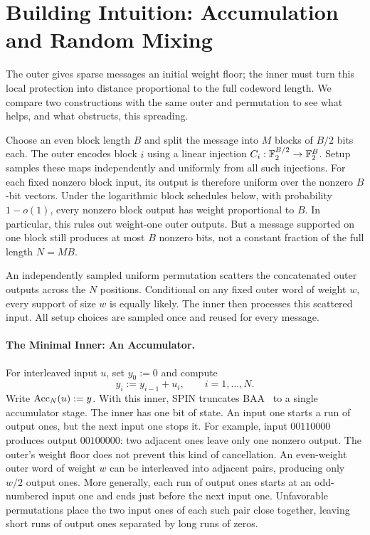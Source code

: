 \section{Building Intuition: Accumulation and Random Mixing}
\label{sec:spin-intuition}

The outer gives sparse messages an initial weight floor; the inner must
turn this local protection into distance proportional to the full codeword
length. We compare two constructions with the same outer and permutation
to see what helps, and what obstructs, this spreading.

Choose an even block length $B$ and split the message into $M$ blocks of
$B/2$ bits each. The outer encodes block $i$ using a linear injection
$C_i:\mathbb F_2^{B/2}\to\mathbb F_2^B$. Setup samples these maps independently and
uniformly from all such injections. For each fixed nonzero block input,
its output is therefore uniform over the nonzero $B$-bit vectors.
Under the logarithmic block schedules below, with probability $1-o(1)$,
every nonzero block output has weight proportional to $B$.
In particular, this rules out weight-one outer outputs. But a message
supported on one block still produces at most $B$ nonzero bits, not a
constant fraction of the full length $N=MB$.

An independently sampled uniform permutation scatters the concatenated
outer outputs across the $N$ positions. Conditional on any fixed outer
word of weight $w$, every support of size $w$ is equally likely. The inner
then processes this scattered input. All setup choices are sampled once
and reused for every message.

\paragraph{The Minimal Inner: An Accumulator.}
For interleaved input $u$, set $y_0:=0$ and compute
\[
  y_i:=y_{i-1}+u_i,\qquad i=1,\ldots,N.
\]
Write $\operatorname{Acc}_N(u):=y$. With this inner, SPIN truncates
BAA~\cite{KolesnikovEtAl2026BA} to a single accumulator stage.
The inner has one bit of state. An input one starts a run of output ones,
but the next input one stops it. For example, input $00110000$ produces
output $00100000$: two adjacent ones leave only one nonzero output.
The outer's weight floor does not prevent this kind of cancellation.
An even-weight outer word of weight $w$ can be interleaved into adjacent
pairs, producing only $w/2$ output ones. More generally, each run of output ones starts at an odd-numbered input one
and ends just before the next input one. Unfavorable permutations place the
two input ones of each such pair close together,
leaving short runs of output ones separated by long runs of zeros.

